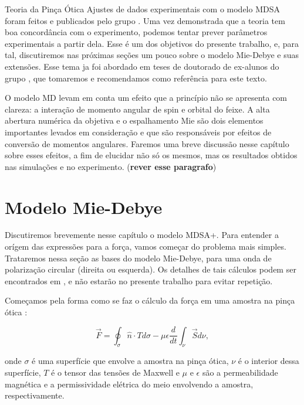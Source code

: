 \begin{chapter}{Teoria da Pinça Ótica}
%
Ajustes de dados experimentais com o modelo MDSA foram feitos e publicados pelo grupo \cite{viana_2006, kaina}. Uma vez demonstrada que a teoria tem boa concordância com o experimento, podemos tentar prever parâmetros experimentais a partir dela. Esse é um dos objetivos do presente trabalho, e, para tal, discutiremos nas próximas seções um pouco sobre o modelo Mie-Debye e suas extensões. Esse tema ja foi abordado em teses de doutorado de ex-alunos do grupo \cite{Mazolli, Rafael}, que tomaremos e recomendamos como referência para este texto.

O modelo MD levam em conta um efeito que a princípio não se apresenta com clareza: a interação de momento angular de spin e orbital do feixe. A alta abertura numérica da objetiva e o espalhamento Mie são dois elementos importantes levados em consideração e que são responsáveis por efeitos de conversão de momentos angulares\cite{Bliokh2015}. Faremos uma breve discussão nesse capítulo sobre esses efeitos, a fim de elucidar não só os mesmos, mas os resultados obtidos nas simulações e no experimento. ({\bf rever esse paragrafo})

%
%
%
%
\section{Modelo Mie-Debye}

\hspace{5 mm}Discutiremos brevemente nesse capítulo o modelo MDSA+. Para entender a orígem das expressões para a força, vamos começar do problema mais simples. Trataremos nessa seção as bases do modelo Mie-Debye, para uma onda de polarização circular (direita ou esquerda). Os detalhes de tais cálculos podem ser encontrados em \cite{mazolli}, e não estarão no presente trabalho para evitar repetição. 

Começamos pela forma como se faz o cálculo da força em uma amostra na pinça ótica \cite{jackson}:

\begin{equation}
\vec{F} = \oint_{\sigma} \hat{n} \cdot T d \sigma - \mu \epsilon \frac{d}{dt} \int_{\nu} \vec{S} d \nu,
\label{2_F}
\end{equation}

onde $\sigma$ é uma superfície que envolve a amostra na pinça ótica, $\nu$ é o interior dessa superfície, $T$ é o tensor das tensões de Maxwell e $\mu$ e $\epsilon$ são a permeabilidade magnética e a permissividade elétrica do meio envolvendo a amostra, respectivamente. 


\end{chapter}
